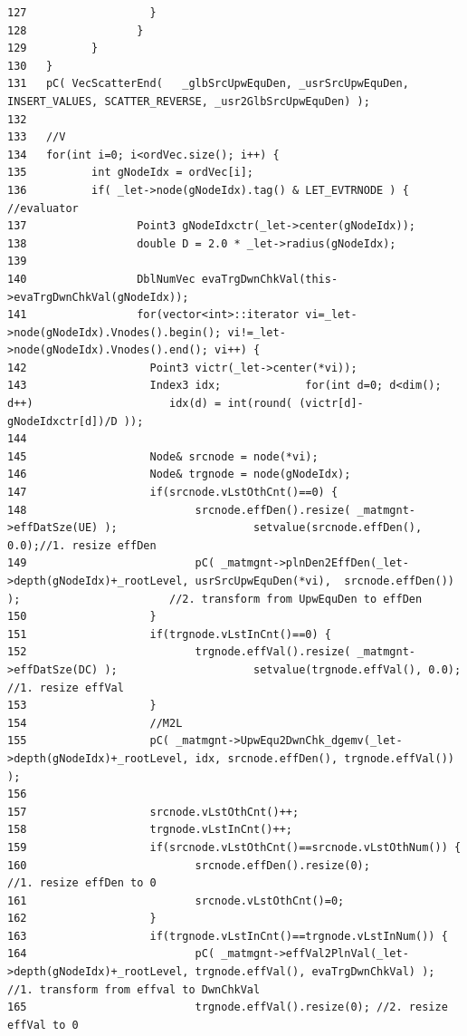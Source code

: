 \begin{verbatim}
127                   }
128                 }
129          }
130   }
131   pC( VecScatterEnd(   _glbSrcUpwEquDen, _usrSrcUpwEquDen, INSERT_VALUES, SCATTER_REVERSE, _usr2GlbSrcUpwEquDen) );
132   
133   //V
134   for(int i=0; i<ordVec.size(); i++) {
135          int gNodeIdx = ordVec[i];
136          if( _let->node(gNodeIdx).tag() & LET_EVTRNODE ) { //evaluator          
137                 Point3 gNodeIdxctr(_let->center(gNodeIdx));
138                 double D = 2.0 * _let->radius(gNodeIdx);
139                 
140                 DblNumVec evaTrgDwnChkVal(this->evaTrgDwnChkVal(gNodeIdx));
141                 for(vector<int>::iterator vi=_let->node(gNodeIdx).Vnodes().begin(); vi!=_let->node(gNodeIdx).Vnodes().end(); vi++) {
142                   Point3 victr(_let->center(*vi));
143                   Index3 idx;             for(int d=0; d<dim(); d++)                     idx(d) = int(round( (victr[d]-gNodeIdxctr[d])/D ));
144                   
145                   Node& srcnode = node(*vi);
146                   Node& trgnode = node(gNodeIdx);
147                   if(srcnode.vLstOthCnt()==0) {
148                          srcnode.effDen().resize( _matmgnt->effDatSze(UE) );                     setvalue(srcnode.effDen(), 0.0);//1. resize effDen
149                          pC( _matmgnt->plnDen2EffDen(_let->depth(gNodeIdx)+_rootLevel, usrSrcUpwEquDen(*vi),  srcnode.effDen()) );                       //2. transform from UpwEquDen to effDen
150                   }
151                   if(trgnode.vLstInCnt()==0) {
152                          trgnode.effVal().resize( _matmgnt->effDatSze(DC) );                     setvalue(trgnode.effVal(), 0.0);                        //1. resize effVal
153                   }
154                   //M2L           
155                   pC( _matmgnt->UpwEqu2DwnChk_dgemv(_let->depth(gNodeIdx)+_rootLevel, idx, srcnode.effDen(), trgnode.effVal()) );
156                   
157                   srcnode.vLstOthCnt()++;
158                   trgnode.vLstInCnt()++;
159                   if(srcnode.vLstOthCnt()==srcnode.vLstOthNum()) {
160                          srcnode.effDen().resize(0);                     //1. resize effDen to 0
161                          srcnode.vLstOthCnt()=0;
162                   }
163                   if(trgnode.vLstInCnt()==trgnode.vLstInNum()) {
164                          pC( _matmgnt->effVal2PlnVal(_let->depth(gNodeIdx)+_rootLevel, trgnode.effVal(), evaTrgDwnChkVal) );                     //1. transform from effval to DwnChkVal
165                          trgnode.effVal().resize(0); //2. resize effVal to 0

\end{verbatim}
